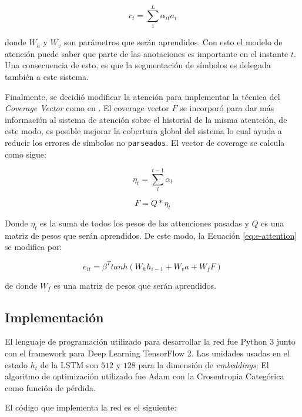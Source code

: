 \begin{equation}
    c_{t} = \sum_{i} ^ {L} \alpha_{it}a_{i}
\end{equation}

donde $W_{h}$ y $W_{v}$ son parámetros que serán aprendidos. Con esto el modelo de atención puede saber que parte de las anotaciones es importante en el instante $t$. Una consecuencia de esto, es que la segmentación de símbolos es delegada también a este sistema.

Finalmente, se decidió modificar la atención para implementar la técnica del \textit{Coverage Vector} como en \cite{chino}. El coverage vector $F$ se incorporó para dar más información al sistema de atención sobre el historial de la misma atentción, de este modo, es posible mejorar la cobertura global del sistema lo cual ayuda a reducir los errores de símbolos no \texttt{parseados}. El vector de coverage se calcula como sigue:

\begin{equation}
    \eta_{t} = \sum_{l}^{t-1} \alpha_{l}
\end{equation}

\begin{equation}
    F = Q * \eta_{t}
    \label{eq:coverage-vector}
\end{equation}

Donde $\eta_{t}$ es la suma de todos los pesos de las attenciones pasadas y $Q$ es una matriz de pesos que serán aprendidos. De este modo, la Ecuación \ref{eq:e-attention} se modifica por:

\begin{equation}
    e_{it} = \beta ^ {T} tanh(W_{h}h_{i-1} + W_{v}a + W_{f}F)
\end{equation}

de donde $W_{f}$ es una matriz de pesos que serán aprendidos.

\subsection{Implementación}

El lenguaje de programación utilizado para desarrollar la red fue Python 3 junto con el framework para Deep Learning TensorFlow 2. Las unidades usadas en el estado $h_{t}$ de la LSTM son $512$ y $128$ para la dimensión de \textit{embeddings}. El algoritmo de optimización utilizado fue Adam con la Crosentropia Categórica como función de pérdida. 

El código que implementa la red es el siguiente:

